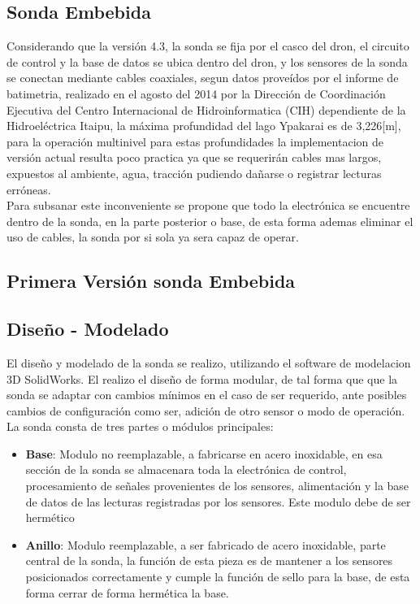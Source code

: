 \begin{appendices}
\subsection{Sonda Embebida}
Considerando que la versión 4.3, la sonda se fija por el casco del dron, el circuito de control y la base de datos se ubica dentro del dron, y los sensores de la sonda se conectan mediante cables coaxiales, segun datos proveídos por el informe de batimetria, realizado en el agosto del 2014  por la Dirección de Coordinación Ejecutiva del Centro Internacional de Hidroinformatica (CIH) dependiente de la Hidroeléctrica Itaipu, la máxima profundidad del lago Ypakarai es de 3,226[m], para la operación multinivel para estas profundidades la implementacion de versión actual resulta poco practica ya que se requerirán cables mas largos, expuestos al ambiente, agua, tracción pudiendo dañarse o registrar lecturas erróneas.\\ Para subsanar este inconveniente se propone que todo la electrónica se encuentre dentro de la sonda, en la parte posterior o base, de esta forma ademas eliminar el uso de cables, la sonda por si sola ya sera capaz de operar.

\subsection{Primera Versi\'on sonda Embebida}

\subsection{Diseño - Modelado}
El dise\~no y modelado de la sonda se realizo, utilizando el software de modelacion 3D SolidWorks.
El realizo el diseño de forma modular, de tal forma que que la sonda se adaptar con cambios mínimos en el caso de ser requerido, ante posibles cambios de configuración como ser, adición de otro sensor o modo de operación.    
La sonda consta de tres partes o módulos principales:

\begin{itemize}
\item \textbf{Base}: Modulo no reemplazable, a fabricarse en acero inoxidable, en esa sección de la sonda se almacenara toda la electrónica de control, procesamiento de señales provenientes de los sensores, alimentación y la base de datos de las lecturas registradas por los sensores. Este modulo debe de ser hermético 

\item \textbf{Anillo}: Modulo reemplazable, a ser fabricado de acero inoxidable, parte central de la sonda, la función de esta pieza es de mantener a los sensores posicionados correctamente y cumple la función de sello para la base, de esta forma cerrar de forma hermética la base.


\end{itemize}
\end{appendices}
